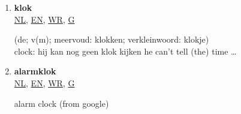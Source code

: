 \begin{multicols}{2}
\begin{enumerate}
\item \parbox[t][][t]{35mm}{\textbf{klok}\\\href{https://www.vandale.nl/gratis-woordenboek/nederlands/betekenis/klok}{\tiny NL}{\tiny, }\href{https://www.vandale.nl/gratis-woordenboek/nederlands-engels/vertaling/klok}{\tiny EN}{\tiny, }\href{https://www.wordreference.com/nlen/klok}{\tiny WR}{\tiny, }\href{https://translate.google.com/\#view=home\&op=translate\&sl=nl\&tl=en\&text=klok}{\tiny G}} \parbox[t][][t]{55mm}{(de; v(m); meervoud: klokken; verkleinwoord: klokje)\\clock: hij kan nog geen klok kijken he can't tell (the) time \ldots}
\item \parbox[t][][t]{35mm}{\textbf{alarmklok}\\\href{https://www.vandale.nl/gratis-woordenboek/nederlands/betekenis/alarmklok}{\tiny NL}{\tiny, }\href{https://www.vandale.nl/gratis-woordenboek/nederlands-engels/vertaling/alarmklok}{\tiny EN}{\tiny, }\href{https://www.wordreference.com/nlen/alarmklok}{\tiny WR}{\tiny, }\href{https://translate.google.com/\#view=home\&op=translate\&sl=nl\&tl=en\&text=alarmklok}{\tiny G}} \parbox[t][][t]{55mm}{alarm clock {\tiny (from google)}}
\end{enumerate}
\end{multicols}
